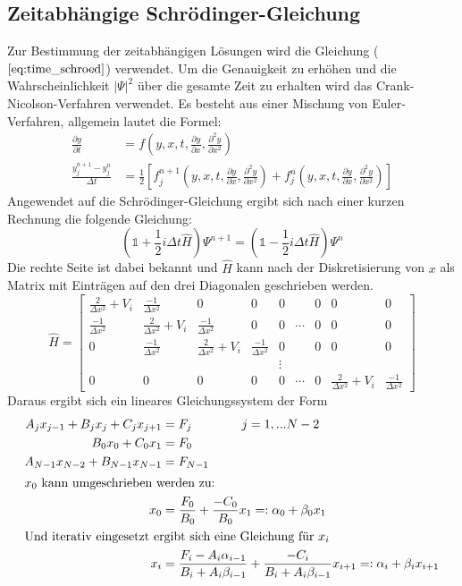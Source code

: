 \documentclass[a4paper, 11pt]{scrartcl}
\begin{document}
\subsection{Zeitabhängige Schrödinger-Gleichung}
Zur Bestimmung der zeitabhängigen Lösungen wird die Gleichung ($\ref{eq:time_schroed}$) verwendet. Um die Genauigkeit zu erhöhen und die Wahrscheinlichkeit $\vert \Psi \vert^2$ über die gesamte Zeit zu erhalten wird das Crank-Nicolson-Verfahren verwendet. Es besteht aus einer Mischung von Euler-Verfahren, allgemein lautet die Formel:
%
\begin{align}
\frac{\partial y}{\partial t} & = f \left( y, x, t, \frac{\partial y}{\partial x}, \frac{\partial^2 y}{\partial x^2} \right) \\
\frac{y^{n+1}_j - y^{n}_j}{\Delta t} & = \frac{1}{2} \left[f^{n+1}_j \left( y, x, t, \frac{\partial y}{\partial x}, \frac{\partial^2 y}{\partial x^2} \right) + f^{n}_j \left( y, x, t, \frac{\partial y}{\partial x}, \frac{\partial^2 y}{\partial x^2} \right) \right]
\end{align}
%
Angewendet auf die Schrödinger-Gleichung ergibt sich nach einer kurzen Rechnung die folgende Gleichung:
%
\begin{equation}
\left( \mathds{1} + \frac{1}{2} i \Delta t \hat{H} \right) \Psi^{n+1} = \left( \mathds{1} - \frac{1}{2} i \Delta t \hat{H} \right) \Psi^{n}
\end{equation}
%
Die rechte Seite ist dabei bekannt und $\hat{H}$ kann nach der Diskretisierung von $x$ als Matrix mit Einträgen auf den drei Diagonalen geschrieben werden.
%
\begin{equation}
\hat{H} = \begin{bmatrix}%
\frac{2}{\Delta x^2} + V_i & \frac{-1}{\Delta x^2} & 0 & 0 & 0 & & 0 & 0 & 0\\
\frac{-1}{\Delta x^2} & \frac{2}{\Delta x^2} + V_i & \frac{-1}{\Delta x^2} & 0 & 0 & \cdots & 0 & 0 & 0\\
0 &\frac{-1}{\Delta x^2} & \frac{2}{\Delta x^2} + V_i & \frac{-1}{\Delta x^2} & 0 & & 0 & 0 & 0 \\
& & & & \vdots & & & &\\
0 & 0 & 0 & 0 & 0 & \cdots & 0 & \frac{2}{\Delta x^2} + V_i & \frac{-1}{\Delta x^2}
\end{bmatrix}%
\end{equation}
%
Daraus ergibt sich ein lineares Gleichungssystem der Form
%
\begin{align}
A_j x_{j-1} + B_{j} x_j + C_{j} x_{j+1} & = F_j \qquad \qquad j = 1, ... N-2 \\
B_0 x_0 + C_0 x_1 & = F_0 \\
A_{N-1} x_{N-2} + B_{N-1} x_{N-1} & = F_{N-1} \\
\intertext{$x_0$ kann umgeschrieben werden zu:}
x_0 & = \frac{F_0}{B_0} + \frac{-C_0}{B_0} x_1 =: \alpha_0 + \beta_0 x_1 \\
\intertext{Und iterativ eingesetzt ergibt sich eine Gleichung für $x_i$}
x_i & = \frac{F_i - A_i \alpha_{i-1}}{B_i + A_i \beta_{i-1}} + \frac{- C_i}{B_i + A_i \beta_{i-1}}x_{i+1} =: \alpha_{i} + \beta_{i} x_{i+1}
\end{align}
\end{document}
